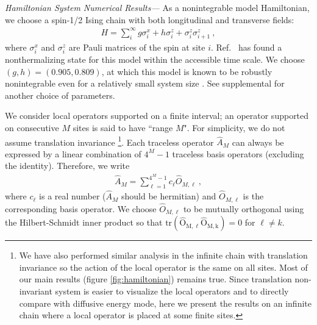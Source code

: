 \documentclass[twocolumn,superscriptaddress, prb]{revtex4-1}
\begin{document}
{\it Hamiltonian System Numerical Results---}
As a nonintegrable model Hamiltonian, we choose a spin-1/2 Ising chain with both longitudinal and transverse fields:
\begin{align}
H = \sum_{i}^{\infty} g\sigma^x_i + h\sigma^z_i + \sigma^z_i \sigma^z_{i+1} ~,
\label{eq:Hamiltonian}
\end{align}
where $\sigma^x_i$ and $\sigma^z_i$ are Pauli matrices of the spin at site $i$.
Ref.~ has found a nonthermalizing state for this model within the accessible time scale.
We choose $(g,h) = (0.905, 0.809)$, at which this model is known to be robustly nonintegrable even for a relatively small system size \cite{Kim:2013}.
See supplemental for another choice of parameters.

We consider local operators supported on a finite interval; an operator supported on consecutive $M$ sites is said to have ``range $M$".
For simplicity, we do not assume translation invariance
\footnote{We have also performed similar analysis in the infinite chain with translation invariance so the action of the local operator is the same on all sites. Most of our main results (figure \ref{fig:hamiltonian})
remains true. Since translation non-invariant system is easier to visualize the local operators and to directly compare with diffusive energy mode, here we present the results on an infinite chain where a local operator is placed at some finite sites.}.
Each traceless operator
$\hat{A}_M$ can always be expressed by a linear combination of $4^M - 1$ traceless basis operators (excluding the identity).
Therefore, we write
\begin{align}
\hat{A}_M = \sum_{\ell = 1}^{4^M - 1} c_\ell \hat{O}_{M,\ell} ~,
\end{align}
where $c_\ell$ is a real number ($\hat{A}_M$ should be hermitian) and $\hat{O}_{M,\ell}$ is the corresponding basis operator.
We choose $\hat{O}_{M,\ell}$ to be mutually orthogonal using the Hilbert-Schmidt inner product so that
$\mathrm{tr(\hat{O}_{M,\ell} \hat{O}_{M,k})} = 0$ for $\ell\neq k$.
\end{document}
